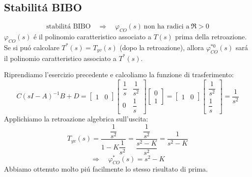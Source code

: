 \documentclass[../main.tex]{subfiles}
\begin{document}
	\subsection{Stabilit\'a BIBO}
		\[
			\text{stabilit\'a BIBO}\quad\Rightarrow\quad \varphi_{CO}(s)\ \text{non ha radici a}\ \Re > 0
		\]
		$ \varphi_{CO}(s) $ \'e il polinomio caratteristico associato a $ T(s) $ prima della retroazione. Se si pu\'o calcolare $ T^{*}(s) = T_{yv}(s) $ (dopo la retroazione), allora $ \varphi^{*0}_{CO}(s) $ sar\'a il polinomio caratteristico associato a $ T^{*}(s) $.
		\begin{Exercise}[title={Studio retroazione alg. sull'uscita con l'algebra dei blocchi}]
			Riprendiamo l'esercizio precedente e calcoliamo la funzione di trasferimento:
			\[
				C(sI-A)^{-1}B +D =
				\begin{bmatrix}
					1 & 0
				\end{bmatrix}
				\begin{bmatrix}
					\dfrac{1}{s} & \dfrac{1}{s^2}\\
					0 & \dfrac{1}{s}
				\end{bmatrix}
				\begin{bmatrix}
					0\\
					1
				\end{bmatrix} =
				\begin{bmatrix}
					1 & 0
				\end{bmatrix}
				\begin{bmatrix}
					\dfrac{1}{s^2}\\
					\dfrac{1}{s}
				\end{bmatrix} =
				\dfrac{1}{s^2}
			\]
			Applichiamo la retroazione algebrica sull'uscita:
			\[
				T_{yv}(s) = \dfrac{\dfrac{1}{s^2}}{1-K\dfrac{1}{s^2}} = \dfrac{\dfrac{1}{s^2}}{\dfrac{s^2-K}{s^2}} = \dfrac{1}{s^2 - K}
			\]
			\[
				\Rightarrow\quad \varphi^{*}_{CO}(s) = s^2 -K
			\]
			Abbiamo ottenuto molto pi\'u facilmente lo stesso risultato di prima.
		\end{Exercise}
	
\end{document}
